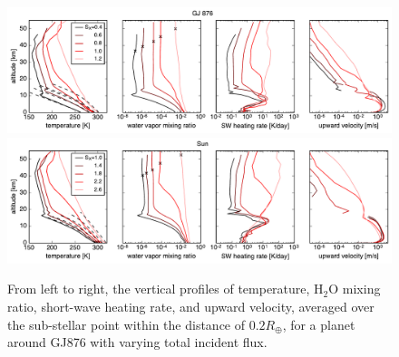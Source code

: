 \documentclass[11pt,numberedappendix,twocolappendix,]{emulateapj}
\def\water{H$_2$O }
\begin{document}
\begin{figure}[htb]
    \begin{center}
    \includegraphics[width=1\hsize]{fig/AqOH0TLS_GJ876_temp_xH2O_vz_heat.pdf}
    \includegraphics[width=1\hsize]{fig/AqOH0TLS_Sun_temp_xH2O_vz_heat.pdf}
    \end{center}
\caption{From left to right, the vertical profiles of temperature, \water mixing ratio, short-wave heating rate, and upward velocity, averaged over the sub-stellar point within the distance of $0.2R_{\oplus }$, for a planet around GJ876 with varying total incident flux. }                                                                                                             
\label{fig:AqOH0TLS_GJ876_temp_xH2O_vz_heat}
\end{figure}
\end{document}
